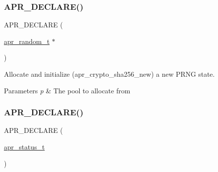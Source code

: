 \subsubsection{\texorpdfstring{A\+P\+R\+\_\+\+D\+E\+C\+L\+A\+R\+E()}{APR\_DECLARE()}\hspace{0.1cm}{\footnotesize\ttfamily [3/4]}}
{\footnotesize\ttfamily A\+P\+R\+\_\+\+D\+E\+C\+L\+A\+RE (\begin{DoxyParamCaption}\item[{\mbox{\hyperlink{group__apr__random_ga33073741e56b1bafe52ba58cefcbbf96}{apr\+\_\+random\+\_\+t}} $\ast$}]{ }\end{DoxyParamCaption})}

Allocate and initialize (apr\+\_\+crypto\+\_\+sha256\+\_\+new) a new P\+R\+NG state. 
\begin{DoxyParams}{Parameters}
{\em p} & The pool to allocate from \\
\hline
\end{DoxyParams}
\mbox{\label{group__apr__random_ga07682b862eda9e40f1d8c1377514b5ac}} 
\subsubsection{\texorpdfstring{A\+P\+R\+\_\+\+D\+E\+C\+L\+A\+R\+E()}{APR\_DECLARE()}\hspace{0.1cm}{\footnotesize\ttfamily [4/4]}}
{\footnotesize\ttfamily A\+P\+R\+\_\+\+D\+E\+C\+L\+A\+RE (\begin{DoxyParamCaption}\item[{\mbox{\hyperlink{group__apr__errno_gaf76ee4543247e9fb3f3546203e590a6c}{apr\+\_\+status\+\_\+t}}}]{ }\end{DoxyParamCaption})}

